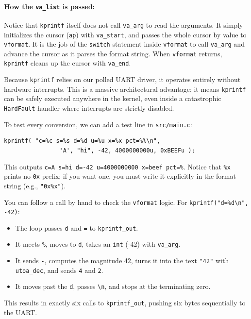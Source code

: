 \paragraph{How the \texttt{va\_list} is passed:}
Notice that \texttt{kprintf} itself does not call \texttt{va\_arg} to read the arguments. It simply initializes the cursor (\texttt{ap}) with \texttt{va\_start}, and passes the whole cursor by value to \texttt{vformat}. It is the job of the \texttt{switch} statement inside \texttt{vformat} to call \texttt{va\_arg} and advance the cursor as it parses the format string. When \texttt{vformat} returns, \texttt{kprintf} cleans up the cursor with \texttt{va\_end}.

Because \texttt{kprintf} relies on our polled UART driver, it operates entirely without hardware interrupts. This is a massive architectural advantage: it means \texttt{kprintf} can be safely executed anywhere in the kernel, even inside a catastrophic \texttt{HardFault} handler where interrupts are strictly disabled.

To test every conversion, we can add a test line in \texttt{src/main.c}:
\begin{lstlisting}
kprintf( "c=%c s=%s d=%d u=%u x=%x pct=%%\n", 
                'A', "hi", -42, 4000000000u, 0xBEEFu );
\end{lstlisting}
This outputs \texttt{c=A s=hi d=-42 u=4000000000 x=beef pct=\%}. Notice that \texttt{\%x} prints no \texttt{0x} prefix; if you want one, you must write it explicitly in the format string (e.g., \texttt{"0x\%x"}).

You can follow a call by hand to check the \texttt{vformat} logic. For \texttt{kprintf("d=\%d\textbackslash{}n", -42)}:
\begin{itemize}
    \item The loop passes \texttt{d} and \texttt{=} to \texttt{kprintf\_out}.
    \item It meets \texttt{\%}, moves to \texttt{d}, takes an \texttt{int} (-42) with \texttt{va\_arg}.
    \item It sends \texttt{-}, computes the magnitude 42, turns it into the text \texttt{"42"} with \texttt{utoa\_dec}, and sends \texttt{4} and \texttt{2}.
    \item It moves past the \texttt{d}, passes \texttt{\textbackslash{}n}, and stops at the terminating zero.
\end{itemize}
This results in exactly six calls to \texttt{kprintf\_out}, pushing six bytes sequentially to the UART.

